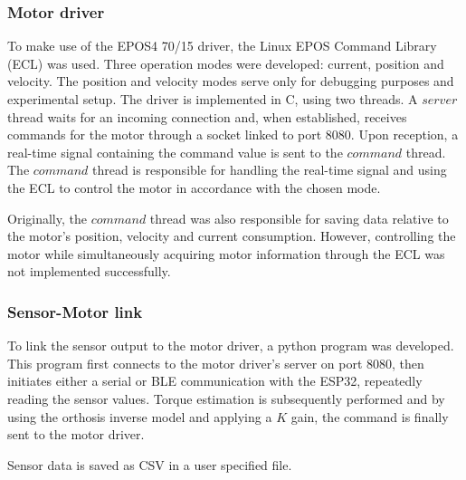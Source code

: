 \subsubsection{Motor driver}
To make use of the EPOS4 70/15 driver, the Linux EPOS Command Library (ECL) was used.  
Three operation modes were developed: current, position and velocity. The position 
and velocity modes serve only for debugging purposes and experimental setup. The driver
is implemented in C, using two threads. A $server$ thread waits for an incoming 
connection and, when established, receives commands for the motor through a socket 
linked to port 8080. Upon reception, a real-time signal containing the command value 
is sent to the $command$ thread. The $command$ thread is responsible for handling 
the real-time signal and using the ECL to control the motor in accordance with the 
chosen mode.  

Originally, the $command$ thread was also responsible for saving data relative to 
the motor's position, velocity and current consumption. However, controlling the 
motor while simultaneously acquiring motor information through the ECL was not 
implemented successfully.  
\FloatBarrier

\subsubsection{Sensor-Motor link}
To link the sensor output to the motor driver, a python program was developed. 
This program first connects to the motor driver's server on port 8080, then 
initiates either a serial or BLE communication with the ESP32, repeatedly reading 
the sensor values. Torque estimation is subsequently performed and by using the 
orthosis inverse model and applying a $K$ gain, the command is finally sent to 
the motor driver.  

Sensor data is saved as CSV in a user specified file.  
